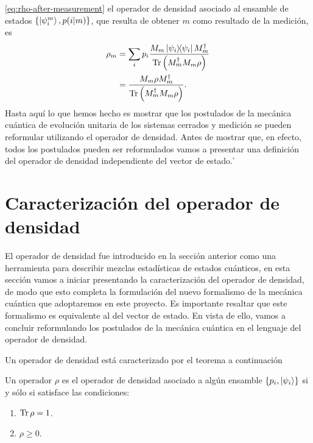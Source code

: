 \eqref{eq:rho-after-measurement} el operador
de densidad asociado al ensamble de estados 
$\qty{\ket{\psi_i^m},p(i\vert m)}$, que resulta de obtener $m$ como resultado
de la medición, es
\begin{align}
	\rho _m &= \sum _i p_i \frac{M_m\dyad{\psii}{\psii}M_m^{\dagger}}
	{\Tr \qty(M_m^{\dagger}M_m\rho)} \nonumber \\
					&= \frac{M_m\rho M_m^{\dagger}}
	{\Tr \qty(M_m^{\dagger}M_m\rho)}.
\end{align}
Hasta aquí lo que hemos hecho es mostrar que los postulados de la
mecánica cuántica de evolución unitaria de los sistemas cerrados y 
medición se pueden reformular utilizando el operador de densidad.
Antes de mostrar que, en efecto, todos los postulados pueden 
ser reformulados  vamos a presentar una definición del operador 
de densidad independiente del vector de estado. 
\h{}

\section{Caracterización del operador de densidad} %
El operador de densidad fue introducido en la sección anterior
como una herramienta para describir mezclas estadísticas de estados cuánticos,
en esta sección vamos a iniciar presentando 
la caracterización del operador de densidad, de modo que
esto completa la formulación del nuevo formalismo de la mecánica cuántica
que adoptaremos en este proyecto. Es importante resaltar que este
formalismo es equivalente al del vector de estado. En vista de ello, 
vamos a concluir reformulando los postulados de la mecánica cuántica 
en el lenguaje del operador de densidad.

Un operador de densidad está caracterizado por el teorema a continuación
\begin{teorema}
Un operador $\rho$ es el operador de densidad asociado a algún ensamble 
$\{p_i, \ket{\psi _i} \}$ si y sólo si satisface las condiciones:
\begin{enumerate}
\item $\Tr \rho = 1$.
\item $\rho \geq 0$.
\end{enumerate}	
\end{teorema}

